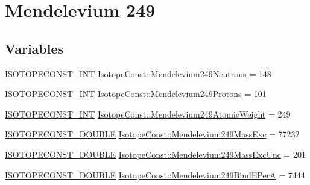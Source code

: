 \hypertarget{group___isotope_const-_mendelevium-_md249}{}\section{Mendelevium 249}
\label{group___isotope_const-_mendelevium-_md249}
\subsection*{Variables}
\begin{DoxyCompactItemize}
\item 
\mbox{\hyperlink{group___isotope_const-_macros_ga5f18360b3e99483a35c32d789e62621c}{I\+S\+O\+T\+O\+P\+E\+C\+O\+N\+S\+T\+\_\+\+I\+NT}} \mbox{\hyperlink{group___isotope_const-_mendelevium-_md249_ga161f10a97b58a57b13f53fb43c796290}{Isotope\+Const\+::\+Mendelevium249\+Neutrons}} = 148
\item 
\mbox{\hyperlink{group___isotope_const-_macros_ga5f18360b3e99483a35c32d789e62621c}{I\+S\+O\+T\+O\+P\+E\+C\+O\+N\+S\+T\+\_\+\+I\+NT}} \mbox{\hyperlink{group___isotope_const-_mendelevium-_md249_ga7f2b29b327f9716ac608a35ae6586e08}{Isotope\+Const\+::\+Mendelevium249\+Protons}} = 101
\item 
\mbox{\hyperlink{group___isotope_const-_macros_ga5f18360b3e99483a35c32d789e62621c}{I\+S\+O\+T\+O\+P\+E\+C\+O\+N\+S\+T\+\_\+\+I\+NT}} \mbox{\hyperlink{group___isotope_const-_mendelevium-_md249_ga21855ccb529f6df8247663fe76c4a98f}{Isotope\+Const\+::\+Mendelevium249\+Atomic\+Weight}} = 249
\item 
\mbox{\hyperlink{group___isotope_const-_macros_ga8f45a7272ce02c0b4c65c44636ed719a}{I\+S\+O\+T\+O\+P\+E\+C\+O\+N\+S\+T\+\_\+\+D\+O\+U\+B\+LE}} \mbox{\hyperlink{group___isotope_const-_mendelevium-_md249_gaa62543316dce8806f9bb701f2d6d91e2}{Isotope\+Const\+::\+Mendelevium249\+Mass\+Exc}} = 77232
\item 
\mbox{\hyperlink{group___isotope_const-_macros_ga8f45a7272ce02c0b4c65c44636ed719a}{I\+S\+O\+T\+O\+P\+E\+C\+O\+N\+S\+T\+\_\+\+D\+O\+U\+B\+LE}} \mbox{\hyperlink{group___isotope_const-_mendelevium-_md249_ga16300fb1751b85315581f9485a614528}{Isotope\+Const\+::\+Mendelevium249\+Mass\+Exc\+Unc}} = 201
\item 
\mbox{\hyperlink{group___isotope_const-_macros_ga8f45a7272ce02c0b4c65c44636ed719a}{I\+S\+O\+T\+O\+P\+E\+C\+O\+N\+S\+T\+\_\+\+D\+O\+U\+B\+LE}} \mbox{\hyperlink{group___isotope_const-_mendelevium-_md249_gaf531ab66737a742265eb7b72034a6925}{Isotope\+Const\+::\+Mendelevium249\+Bind\+E\+PerA}} = 7444

\end{DoxyCompactItemize}
